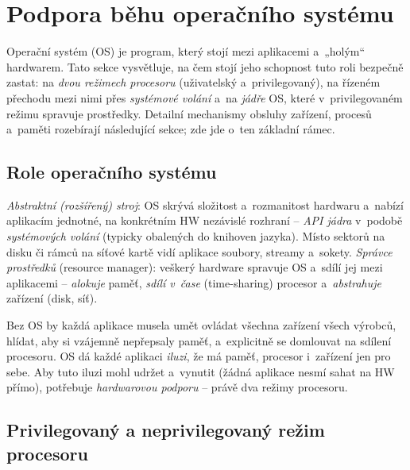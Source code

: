 \section{Podpora běhu operačního systému}

Operační systém (OS) je program, který stojí mezi aplikacemi a~„holým`` hardwarem. Tato sekce vysvětluje, na čem stojí jeho schopnost tuto roli bezpečně zastat: na \emph{dvou režimech procesoru} (uživatelský a~privilegovaný), na řízeném přechodu mezi nimi přes \emph{systémové volání} a~na \emph{jádře} OS, které v~privilegovaném režimu spravuje prostředky. Detailní mechanismy obsluhy zařízení, procesů a~paměti rozebírají následující sekce; zde jde o~ten základní rámec.

\subsection{Role operačního systému}

\begin{definice}
\emph{Abstraktní (rozšířený) stroj}: OS skrývá složitost a~rozmanitost hardwaru a~nabízí aplikacím jednotné, na konkrétním HW nezávislé rozhraní -- \emph{API jádra} v~podobě \emph{systémových volání} (typicky obalených do knihoven jazyka). Místo sektorů na disku či rámců na síťové kartě vidí aplikace soubory, streamy a~sokety.
\emph{Správce prostředků} (resource manager): veškerý hardware spravuje OS a~sdílí jej mezi aplikacemi -- \emph{alokuje} paměť, \emph{sdílí v~čase} (time-sharing) procesor a~\emph{abstrahuje} zařízení (disk, síť).
\end{definice}

\begin{intuice}
Bez OS by každá aplikace musela umět ovládat všechna zařízení všech výrobců, hlídat, aby si vzájemně nepřepsaly paměť, a~explicitně se domlouvat na sdílení procesoru. OS dá každé aplikaci \emph{iluzi}, že má paměť, procesor i~zařízení jen pro sebe. Aby tuto iluzi mohl udržet a~vynutit (žádná aplikace nesmí sahat na HW přímo), potřebuje \emph{hardwarovou podporu} -- právě dva režimy procesoru.
\end{intuice}

\subsection{Privilegovaný a neprivilegovaný režim procesoru}


